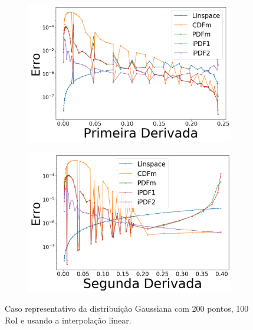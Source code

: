 \begin{figure}[H]
	\begin{subfigure}[b]{0.45\textwidth}
		\centering 
		\includegraphics[width=\textwidth]{./figuras/error_normal_linear_Primeira_Derivada.png}
		\caption{}
		\label{fig:11c}
	\end{subfigure}
	\hfill
	\begin{subfigure}[b]{0.45\textwidth}
		\centering 
		\includegraphics[width=\textwidth]{./figuras/error_normal_linear_Segunda_Derivada.png}
		\caption{}
		\label{fig:11d}
	\end{subfigure}
	\caption{Caso representativo da distribuição Gaussiana com 200 pontos, 100 \ac{RoI} e usando a interpolação linear.}\label{fig:11}
\end{figure}

